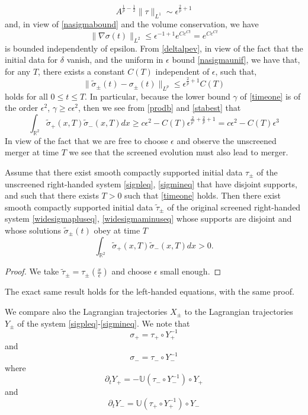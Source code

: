 \documentclass[11pt,reqno]{amsproc}
\newcommand{\pa}{\partial}
\newcommand{\la}{\label}
\newcommand{\fr}{\frac}
\newcommand{\na}{\nabla}
\newcommand{\be}{\begin{equation}}
\newcommand{\ee}{\end{equation}}
\newcommand{\Rr}{{\mathbb R}}
\newcommand{\beg}{\begin}
\begin{document}
\be
A^{\fr{1}{p}-\fr{1}{2}}\|\tau\|_{L^1} \sim \epsilon^{\fr{2}{p} +1}
\la{forcesize}
\ee
and, in view of \eqref{nasigmabound} and the volume conservation, we have
\be
\|\na\sigma(t)\|_{L^2} \le \epsilon^{-1+1}e^{Ce^{Ct}} = e^{Ce^{Ct}}
\la{nasigmaunif}
\ee
 is bounded independently of epsilon. From \eqref{deltalpev}, in view of the fact that the initial data for $\delta $ vanish, and the uniform in $\epsilon$ bound \eqref{nasigmaunif}, we have that, for any $T$, there exists
 a constant $C(T)$ independent of $\epsilon$, such that,
\be
\|\widetilde\sigma_{\pm}(t) - \sigma_{\pm}(t)\|_{L^p} \le \epsilon^{\fr{2}{p} +1}C(T)
\la{stabest}
\ee
holds for all $0\le t\le T$.  In particular,  because the lower bound $\gamma$ of \eqref{timeone} is of the order $\epsilon^2$, $\gamma\ge c\epsilon^2$, then we see from \eqref{prodb} and \eqref{stabest} that
\be
\int_{\Rr^2}\widetilde\sigma_+(x,T)\widetilde\sigma_-(x,T)dx \ge c\epsilon^2 -
C(T)\epsilon^{\fr{2}{p'} + \fr{2}{p} +1} = c\epsilon^2- C(T)\epsilon^3
\la{voila}
\ee
In view of the fact that we are free to choose $\epsilon$ and observe the unscreened merger at time $T$ we see that the screened evolution must also lead to merger.

\beg{thm}\la{stabmerg} Assume that there exist smooth compactly supported initial data $\tau_{\pm}$ of the unscreened right-handed system \eqref{sigpleq}, \eqref{sigmineq} that have disjoint supports, and such that there exists $T>0$  such that \eqref{timeone} holds. Then there exist smooth compactly supported initial data $\widetilde\tau_{\pm}$ of the original screened right-handed system \eqref{widesigmapluseq}, \eqref{widesigmaminuseq} whose supports are disjoint and whose solutions $\widetilde\sigma_{\pm}(t)$ obey  at time $T$
\be
\int_{\Rr^2}\widetilde\sigma_+(x,T)\widetilde\sigma_-(x,T)dx >0.
\la{mergwide}
\ee
\end{thm}
\beg{proof} We take $\widetilde\tau_{\pm} = \tau_{\pm}\left (\fr{x}{\epsilon}\right)$ and choose $\epsilon$ small enough.
\end{proof}

\beg{rem}\la{likewise} The exact same result holds for the left-handed equations, with the same proof.
\end{rem}




We compare also the Lagrangian trajectories $X_{\pm}$ to the Lagrangian trajectories $Y_{\pm}$ of the system
\eqref{sigpleq}-\eqref{sigmineq}.  We note that 
\be
\sigma_+ = \tau_{+}\circ Y_+^{-1}
\la{sigpYmin}
\ee
and
\be
\sigma_- = \tau_-\circ Y_{-}^{-1}
\la{sigminYpl}
\ee
where
\be
\pa_t Y_{+} = -\mathbb U\left (\tau_-\circ Y_-^{-1}\right)\circ Y_{+}
\la{Ypleq}
\ee
and
\be
\pa_t Y_{-} = \mathbb U\left (\tau_+\circ Y_+^{-1}\right)\circ Y_{-}
\la{Ymineq}
\ee
\end{document}
